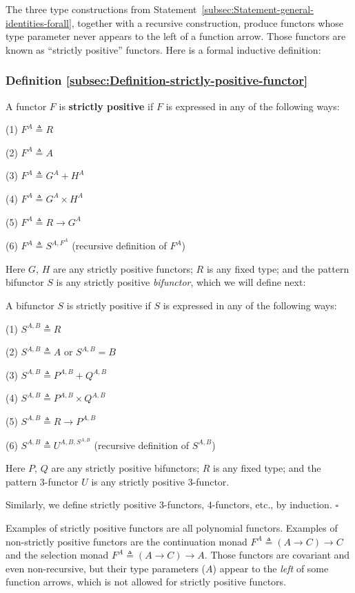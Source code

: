 The three type constructions from Statement~\ref{subsec:Statement-general-identities-forall},
together with a recursive construction, produce functors whose type
parameter never appears to the left of a function arrow. Those functors
are known as \textsf{``}strictly positive\textsf{''} functors. Here is a formal inductive
definition:

\subsubsection{Definition \label{subsec:Definition-strictly-positive-functor}\ref{subsec:Definition-strictly-positive-functor}}

A functor $F$ is  \textbf{strictly
positive} if $F$ is expressed in any of the following ways:

(1) $F^{A}\triangleq R$

(2) $F^{A}\triangleq A$

(3) $F^{A}\triangleq G^{A}+H^{A}$

(4) $F^{A}\triangleq G^{A}\times H^{A}$

(5) $F^{A}\triangleq R\rightarrow G^{A}$

(6) $F^{A}\triangleq S^{A,F^{A}}$ (recursive definition of $F^{A}$)

Here $G$, $H$ are any strictly positive functors; $R$ is any fixed
type; and the pattern bifunctor $S$ is any strictly positive \emph{bifunctor},
which we will define next:

A bifunctor $S$ is strictly positive if $S$ is expressed in any
of the following ways:

(1) $S^{A,B}\triangleq R$

(2) $S^{A,B}\triangleq A$ or $S^{A,B}=B$

(3) $S^{A,B}\triangleq P^{A,B}+Q^{A,B}$

(4) $S^{A,B}\triangleq P^{A,B}\times Q^{A,B}$

(5) $S^{A,B}\triangleq R\rightarrow P^{A,B}$

(6) $S^{A,B}\triangleq U^{A,B,S^{A,B}}$ (recursive definition of
$S^{A,B}$)

Here $P$, $Q$ are any strictly positive bifunctors; $R$ is any
fixed type; and the pattern $3$-functor $U$ is any strictly positive
$3$-functor.

Similarly, we define strictly positive $3$-functors, $4$-functors,
etc., by induction. $\square$

Examples of strictly positive functors are all polynomial functors.
Examples of non-strictly positive functors are the continuation monad
$F^{A}\triangleq(A\rightarrow C)\rightarrow C$ and the selection
monad $F^{A}\triangleq(A\rightarrow C)\rightarrow A$. Those functors
are covariant and even non-recursive, but their type parameters ($A$)
appear to the \emph{left} of some function arrows, which is not allowed
for strictly positive functors.

